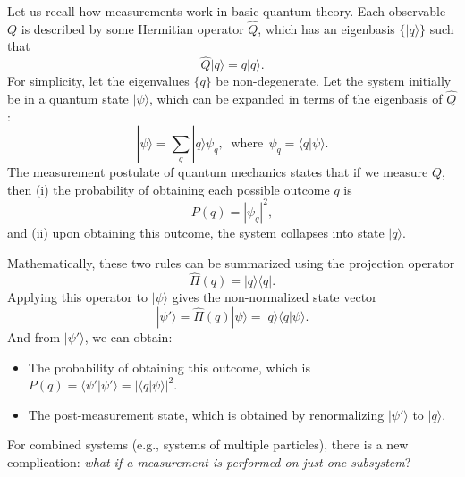 \documentclass[prx,12pt]{revtex4-2}
\begin{document}
Let us recall how measurements work in basic quantum theory.  Each
observable $Q$ is described by some Hermitian operator $\hat{Q}$,
which has an eigenbasis $\{|q\rangle\}$ such that
\begin{equation}
  \hat{Q}|q\rangle = q |q\rangle.
\end{equation}
For simplicity, let the eigenvalues $\{q\}$ be non-degenerate.  Let
the system initially be in a quantum state $|\psi\rangle$, which can
be expanded in terms of the eigenbasis of $\hat{Q}$:
\begin{equation}
  |\psi\rangle = \sum_q |q\rangle \psi_q, \;\;\mathrm{where}\;\, \psi_q = \langle q|\psi\rangle.
  \label{psiexpansion}
\end{equation}
The measurement postulate of quantum mechanics states that if we
measure $Q$, then (i) the probability of obtaining each possible
outcome $q$ is
\begin{equation}
  P(q) = |\psi_q|^2,
  \label{Pq}
\end{equation}
and (ii) upon obtaining this outcome, the system collapses into state
$|q\rangle$.

Mathematically, these two rules can be summarized using the projection
operator
\begin{equation}
  \hat{\Pi}(q) = |q\rangle\langle q|.
  \label{project}
\end{equation}
Applying this operator to $|\psi\rangle$ gives the non-normalized
state vector
\begin{equation}
  |\psi'\rangle = \hat{\Pi}(q) |\psi\rangle = |q\rangle \langle q|\psi\rangle.
\end{equation}
And from $|\psi'\rangle$, we can obtain:
\begin{itemize}
\item The probability of obtaining this outcome, which is
  $P(q) = \langle\psi'|\psi'\rangle = |\langle q|\psi\rangle|^2$.

\item The post-measurement state, which is obtained by renormalizing
  $|\psi'\rangle$ to $|q\rangle$.
\end{itemize}

For combined systems (e.g., systems of multiple particles), there is a
new complication: \textit{what if a measurement is performed on just
  one subsystem}?
\end{document}
